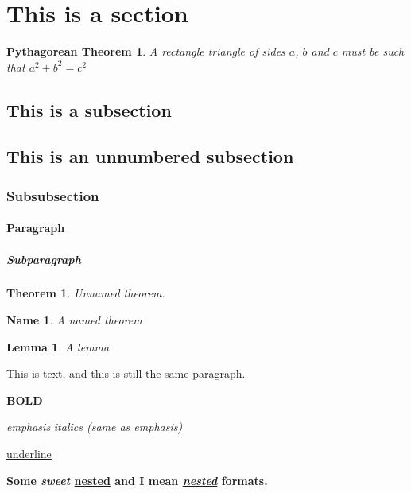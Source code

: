 \documentclass{article}
\title{}
\author{Miguel Murça}
\date{November 10, 2016}
\newtheorem*{theorem0}{Pythagorean Theorem}
\newtheorem{theorem1}{Theorem}
\newtheorem*{theorem2}{Name}
\newtheorem{theorem3}{Lemma}
\begin{document}
\maketitle
\section{This is a section}

\begin{theorem0}
    A rectangle triangle of sides $a$, $b$ and $c$ must be
    such that
    $a^2 + b^2 = c^2$
\end{theorem0}

\subsection{This is a subsection}

\subsection*{This is an unnumbered subsection}

\subsubsection{Subsubsection}

\paragraph{Paragraph}

\subparagraph{Subparagraph}

\begin{theorem1}
    Unnamed theorem.
\end{theorem1}

\begin{theorem2}
    A named theorem
\end{theorem2}

\begin{theorem3}
    A lemma
\end{theorem3}

This is text,
and this is still the same paragraph.

\textbf{BOLD}

\emph{emphasis}
\emph{italics (same as emphasis)}

\underline{underline}

\textbf{Some \emph{sweet} \underline{nested} and I mean \underline{\emph{nested}} formats.}
\end{document}
